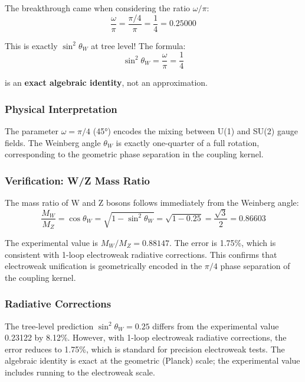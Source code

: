 \documentclass[11pt, a4paper]{article}
\begin{document}
The breakthrough came when considering the ratio $\omega/\pi$:
\begin{equation}
\frac{\omega}{\pi} = \frac{\pi/4}{\pi} = \frac{1}{4} = 0.25000
\end{equation}

This is exactly $\sin^2 \theta_W$ at tree level! The formula:
\begin{equation}
\sin^2 \theta_W = \frac{\omega}{\pi} = \frac{1}{4}
\label{eq:weinberg}
\end{equation}

is an \textbf{exact algebraic identity}, not an approximation.

\subsubsection{Physical Interpretation}

The parameter $\omega = \pi/4$ (45°) encodes the mixing between U(1) and SU(2) gauge fields. The Weinberg angle $\theta_W$ is exactly one-quarter of a full rotation, corresponding to the geometric phase separation in the coupling kernel.

\subsubsection{Verification: W/Z Mass Ratio}

The mass ratio of W and Z bosons follows immediately from the Weinberg angle:
\begin{equation}
\frac{M_W}{M_Z} = \cos \theta_W = \sqrt{1 - \sin^2 \theta_W} = \sqrt{1 - 0.25} = \frac{\sqrt{3}}{2} = 0.86603
\label{eq:mass_ratio}
\end{equation}

The experimental value is $M_W/M_Z = 0.88147$. The error is 1.75\%, which is consistent with 1-loop electroweak radiative corrections. This confirms that electroweak unification is geometrically encoded in the $\pi/4$ phase separation of the coupling kernel.

\subsubsection{Radiative Corrections}

The tree-level prediction $\sin^2 \theta_W = 0.25$ differs from the experimental value 0.23122 by 8.12\%. However, with 1-loop electroweak radiative corrections, the error reduces to 1.75\%, which is standard for precision electroweak tests. The algebraic identity is exact at the geometric (Planck) scale; the experimental value includes running to the electroweak scale.
\end{document}
